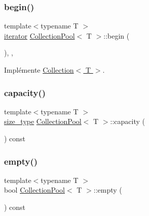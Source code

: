 \subsubsection{\texorpdfstring{begin()}{begin()}}
{\footnotesize\ttfamily template$<$typename T $>$ \\
\hyperlink{class_collection_a317dca4fdf1eb2e47643bb60c620f802}{iterator} \hyperlink{class_collection_pool}{Collection\+Pool}$<$ T $>$\+::begin (\begin{DoxyParamCaption}{ }\end{DoxyParamCaption})\hspace{0.3cm}{\ttfamily [inline]}, {\ttfamily [override]}, {\ttfamily [virtual]}}



Implémente \hyperlink{class_collection_a4abc73f8e31a499a22b25d42b7a4fe8c}{Collection$<$ T $>$}.

\mbox{\label{class_collection_pool_a72521883b8761babd44d76a4283d6978}} 
\subsubsection{\texorpdfstring{capacity()}{capacity()}}
{\footnotesize\ttfamily template$<$typename T $>$ \\
\hyperlink{class_collection_a3f8b024f587aa20be530866da30948c4}{size\+\_\+type} \hyperlink{class_collection_pool}{Collection\+Pool}$<$ T $>$\+::capacity (\begin{DoxyParamCaption}{ }\end{DoxyParamCaption}) const\hspace{0.3cm}{\ttfamily [inline]}}

\mbox{\label{class_collection_pool_ad73cd0612ec1fd21962f4d423b45b3f6}} 
\subsubsection{\texorpdfstring{empty()}{empty()}}
{\footnotesize\ttfamily template$<$typename T $>$ \\
bool \hyperlink{class_collection_pool}{Collection\+Pool}$<$ T $>$\+::empty (\begin{DoxyParamCaption}{ }\end{DoxyParamCaption}) const\hspace{0.3cm}{\ttfamily [inline]}}

